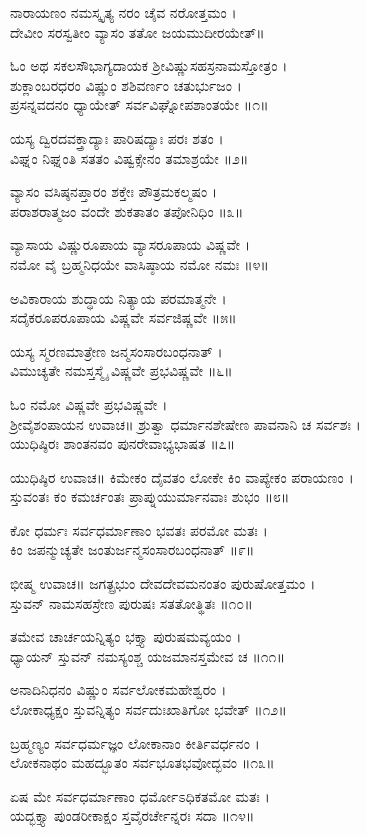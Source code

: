 ನಾರಾಯಣಂ ನಮಸ್ಕೃತ್ಯ ನರಂ ಚೈವ ನರೋತ್ತಮಂ ।\\
ದೇವೀಂ ಸರಸ್ವತೀಂ ವ್ಯಾಸಂ ತತೋ ಜಯಮುದೀರಯೇತ್॥

ಓಂ ಅಥ ಸಕಲಸೌಭಾಗ್ಯದಾಯಕ ಶ್ರೀವಿಷ್ಣುಸಹಸ್ರನಾಮಸ್ತೋತ್ರಂ ।\\

ಶುಕ್ಲಾಂಬರಧರಂ ವಿಷ್ಣುಂ ಶಶಿವರ್ಣಂ ಚತುರ್ಭುಜಂ ।\\
ಪ್ರಸನ್ನವದನಂ ಧ್ಯಾಯೇತ್ ಸರ್ವವಿಘ್ನೋಪಶಾಂತಯೇ ॥೧॥

ಯಸ್ಯ ದ್ವಿರದವಕ್ತ್ರಾದ್ಯಾಃ ಪಾರಿಷದ್ಯಾಃ ಪರಃ ಶತಂ ।\\
ವಿಘ್ನಂ ನಿಘ್ನಂತಿ ಸತತಂ ವಿಷ್ವಕ್ಸೇನಂ ತಮಾಶ್ರಯೇ ॥೨॥

ವ್ಯಾಸಂ ವಸಿಷ್ಠನಪ್ತಾರಂ ಶಕ್ತೇಃ ಪೌತ್ರಮಕಲ್ಮಷಂ ।\\
ಪರಾಶರಾತ್ಮಜಂ ವಂದೇ ಶುಕತಾತಂ ತಪೋನಿಧಿಂ ॥೩॥

ವ್ಯಾಸಾಯ ವಿಷ್ಣುರೂಪಾಯ ವ್ಯಾಸರೂಪಾಯ ವಿಷ್ಣವೇ ।\\
ನಮೋ ವೈ ಬ್ರಹ್ಮನಿಧಯೇ ವಾಸಿಷ್ಠಾಯ ನಮೋ ನಮಃ ॥೪॥

ಅವಿಕಾರಾಯ ಶುದ್ಧಾಯ ನಿತ್ಯಾಯ ಪರಮಾತ್ಮನೇ ।\\
ಸದೈಕರೂಪರೂಪಾಯ ವಿಷ್ಣವೇ ಸರ್ವಜಿಷ್ಣವೇ ॥೫॥

ಯಸ್ಯ ಸ್ಮರಣಮಾತ್ರೇಣ ಜನ್ಮಸಂಸಾರಬಂಧನಾತ್ ।\\
ವಿಮುಚ್ಯತೇ ನಮಸ್ತಸ್ಮೈ ವಿಷ್ಣವೇ ಪ್ರಭವಿಷ್ಣವೇ ॥೬॥

ಓಂ ನಮೋ ವಿಷ್ಣವೇ ಪ್ರಭವಿಷ್ಣವೇ ।\\
ಶ್ರೀವೈಶಂಪಾಯನ ಉವಾಚ॥
ಶ್ರುತ್ವಾ ಧರ್ಮಾನಶೇಷೇಣ ಪಾವನಾನಿ ಚ ಸರ್ವಶಃ ।\\
ಯುಧಿಷ್ಠಿರಃ ಶಾಂತನವಂ ಪುನರೇವಾಭ್ಯಭಾಷತ ॥೭॥

ಯುಧಿಷ್ಠಿರ ಉವಾಚ॥
ಕಿಮೇಕಂ ದೈವತಂ ಲೋಕೇ ಕಿಂ ವಾಪ್ಯೇಕಂ ಪರಾಯಣಂ ।\\
ಸ್ತುವಂತಃ ಕಂ ಕಮರ್ಚಂತಃ ಪ್ರಾಪ್ನುಯುರ್ಮಾನವಾಃ ಶುಭಂ ॥೮॥

ಕೋ ಧರ್ಮಃ ಸರ್ವಧರ್ಮಾಣಾಂ ಭವತಃ ಪರಮೋ ಮತಃ ।\\
ಕಿಂ ಜಪನ್ಮುಚ್ಯತೇ ಜಂತುರ್ಜನ್ಮಸಂಸಾರಬಂಧನಾತ್ ॥೯॥

ಭೀಷ್ಮ ಉವಾಚ॥
ಜಗತ್ಪ್ರಭುಂ ದೇವದೇವಮನಂತಂ ಪುರುಷೋತ್ತಮಂ ।\\
ಸ್ತುವನ್ ನಾಮಸಹಸ್ರೇಣ ಪುರುಷಃ ಸತತೋತ್ಥಿತಃ ॥೧೦॥

ತಮೇವ ಚಾರ್ಚಯನ್ನಿತ್ಯಂ ಭಕ್ತ್ಯಾ ಪುರುಷಮವ್ಯಯಂ ।\\
ಧ್ಯಾಯನ್ ಸ್ತುವನ್ ನಮಸ್ಯಂಶ್ಚ ಯಜಮಾನಸ್ತಮೇವ ಚ ॥೧೧॥

ಅನಾದಿನಿಧನಂ ವಿಷ್ಣುಂ ಸರ್ವಲೋಕಮಹೇಶ್ವರಂ ।\\
ಲೋಕಾಧ್ಯಕ್ಷಂ ಸ್ತುವನ್ನಿತ್ಯಂ ಸರ್ವದುಃಖಾತಿಗೋ ಭವೇತ್ ॥೧೨॥

ಬ್ರಹ್ಮಣ್ಯಂ ಸರ್ವಧರ್ಮಜ್ಞಂ ಲೋಕಾನಾಂ ಕೀರ್ತಿವರ್ಧನಂ ।\\
ಲೋಕನಾಥಂ ಮಹದ್ಭೂತಂ ಸರ್ವಭೂತಭವೋದ್ಭವಂ ॥೧೩॥

ಏಷ ಮೇ ಸರ್ವಧರ್ಮಾಣಾಂ ಧರ್ಮೋಽಧಿಕತಮೋ ಮತಃ ।\\
ಯದ್ಭಕ್ತ್ಯಾ ಪುಂಡರೀಕಾಕ್ಷಂ ಸ್ತವೈರರ್ಚೇನ್ನರಃ ಸದಾ ॥೧೪॥

